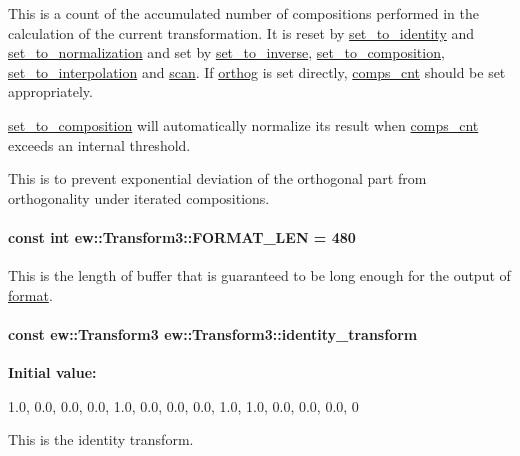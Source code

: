 \label{classew_1_1Transform3_ad2ca5cecae4fe2dfbc8b862b42891991}
This is a count of the accumulated number of compositions performed in the calculation of the current transformation. It is reset by \hyperlink{classew_1_1Transform3_adf9b56b545a70d21c02d2912c368be20}{set\_\-to\_\-identity} and \hyperlink{classew_1_1Transform3_a04a2d12beb56abc7f4432957d7d2af3f}{set\_\-to\_\-normalization} and set by \hyperlink{classew_1_1Transform3_ae5d2a34f86c25e013407bd1e3242118f}{set\_\-to\_\-inverse}, \hyperlink{classew_1_1Transform3_a325fab07876e5adc555c934a5f69eaa7}{set\_\-to\_\-composition}, \hyperlink{classew_1_1Transform3_a29fe78ccd6a5843daf4a1d20c57cf55b}{set\_\-to\_\-interpolation} and \hyperlink{classew_1_1Transform3_afde5bca8b951d4fa6d00239e2ca6ad1d}{scan}. If \hyperlink{classew_1_1Transform3_abbb79dd74876557bc765a54e115c4f66}{orthog} is set directly, \hyperlink{classew_1_1Transform3_ad2ca5cecae4fe2dfbc8b862b42891991}{comps\_\-cnt} should be set appropriately.

\hyperlink{classew_1_1Transform3_a325fab07876e5adc555c934a5f69eaa7}{set\_\-to\_\-composition} will automatically normalize its result when \hyperlink{classew_1_1Transform3_ad2ca5cecae4fe2dfbc8b862b42891991}{comps\_\-cnt} exceeds an internal threshold.

This is to prevent exponential deviation of the orthogonal part from orthogonality under iterated compositions. \hypertarget{classew_1_1Transform3_a2b175dad0b7114445c12ef9928bc34b2}{
\paragraph[{FORMAT\_\-LEN}]{\setlength{\rightskip}{0pt plus 5cm}const int {\bf ew::Transform3::FORMAT\_\-LEN} = 480}\hfill}
\label{classew_1_1Transform3_a2b175dad0b7114445c12ef9928bc34b2}
This is the length of buffer that is guaranteed to be long enough for the output of \hyperlink{classew_1_1Transform3_a42b80dfe1e723349229da7ff40497fdd}{format}. \hypertarget{classew_1_1Transform3_a26e0b30e3ee6032091d94ea73effa0ad}{
\paragraph[{identity\_\-transform}]{\setlength{\rightskip}{0pt plus 5cm}const {\bf ew::Transform3} {\bf ew::Transform3::identity\_\-transform}}\hfill}
\label{classew_1_1Transform3_a26e0b30e3ee6032091d94ea73effa0ad}
{\bfseries Initial value:}
\begin{DoxyCode}
 {
  {{1.0, 0.0, 0.0}, {0.0, 1.0, 0.0}, {0.0, 0.0, 1.0}},
  1.0,
  {0.0, 0.0, 0.0},
  0
}
\end{DoxyCode}
This is the identity transform. 